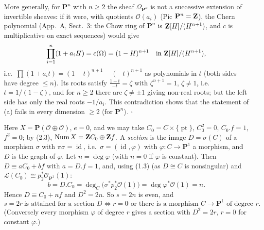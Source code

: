 \documentclass[11pt]{article}
\begin{document}
More generally, for $\mathbf P^n$ with $n\ge2$ the sheaf $\Omega_{\mathbf P^n}$ is not a successive extension of invertible sheaves: if it were, with quotients $\mathcal O(a_i)$ (Pic $\mathbf P^n=\mathbf Z$), the Chern polynomial (App.~A, Sect.~3: the Chow ring of $\mathbf P^n$ is $\mathbf Z[H]/(H^{n+1})$, and $c$ is multiplicative on exact sequences) would give
\[ \prod_{i=1}^n(1+a_iH)=c(\Omega)=(1-H)^{n+1}\quad\text{in }\mathbf Z[H]/(H^{n+1}),\]
i.e.\ $\prod(1+a_it)=(1-t)^{n+1}-(-t)^{n+1}$ as polynomials in $t$ (both sides have degree $\le n$). Its roots satisfy $\frac{1-t}{-t}=\zeta$ with $\zeta^{n+1}=1$, $\zeta\ne1$, i.e.\ $t=1/(1-\zeta)$, and for $n\ge2$ there are $\zeta\neq\pm1$ giving non-real roots; but the left side has only the real roots $-1/a_i$. This contradiction shows that the statement of (a) fails in every dimension $\ge2$ (for $\mathbf P^n$). \hfill$\square$

\pf
Here $X=\mathbf P(\mathcal O\oplus\mathcal O)$, $e=0$, and we may take $C_0=C\times\{\operatorname{pt}\}$, $C_0^2=0$, $C_0.f=1$, $f^2=0$; by (2.3), $\operatorname{Num}X=\mathbf Z C_0\oplus\mathbf Z f$. A \emph{section} is the image $D=\sigma(C)$ of a morphism $\sigma$ with $\pi\sigma=\operatorname{id}$, i.e.\ $\sigma=(\operatorname{id},\varphi)$ with $\varphi\colon C\to\mathbf P^1$ a morphism, and $D$ is the graph of $\varphi$. Let $n=\deg\varphi$ (with $n=0$ if $\varphi$ is constant). Then $D\equiv aC_0+bf$ with $a=D.f=1$, and, using (1.3) (as $D\cong C$ is nonsingular) and $\mathcal L(C_0)\cong p_2^*\mathcal O_{\mathbf P^1}(1)$:
\[ b=D.C_0=\deg_C\bigl(\sigma^*p_2^*\mathcal O(1)\bigr)=\deg\varphi^*\mathcal O(1)=n. \]
Hence $D\equiv C_0+nf$ and $D^2=2n$. So $s=2n$ is even, and
\[ s=2r\ \text{is attained for a section }D\iff r=0\text{ or there is a morphism }C\to\mathbf P^1\text{ of degree }r. \]
(Conversely every morphism $\varphi$ of degree $r$ gives a section with $D^2=2r$, $r=0$ for constant $\varphi$.)
\end{document}
